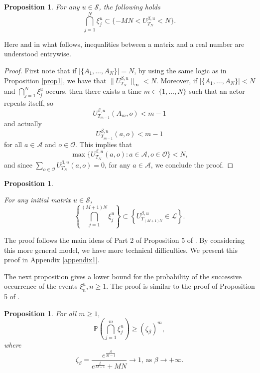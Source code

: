 \documentclass[11pt]{article}
\newtheorem{proposition}[theorem]{Proposition}
\theoremstyle{definition}
\newcommand{\st}{\mathcal{S}}
\newcommand{\A}{\mathcal{A}}
\newcommand{\opn}{\mathcal{O}}
\begin{document}
\begin{proposition} \label{prop2}
For any $u\in \st$, the following holds
$$
 \bigcap_{j=1}^N\xi_j^u\subset\{-MN<U^{\beta,u}_{T_N}<N\}.
$$
\end{proposition}

Here and in what follows, inequalities between a matrix and a real number are understood entrywise.

\begin{proof}
First note that if $|\{A_1, \ldots, A_N\}|=N$, 
by using the same logic as in Proposition \ref{prop1}, we have that $\|U^{\beta,u}_{T_N}\|_\infty<N$. Moreover, if $|\{A_1, \ldots, A_N\}|< N$ and $\bigcap_{j=1}^N\xi_j^u$ occurs, then there exists a time $m \in \{1, \ldots, N\}$ such that an actor repeats itself, so
$$
U_{T_{m-1}}^{\beta,u}(A_m,o) < m-1
$$
and actually
$$
U_{T_{m-1}}^{\beta,u}(a,o) < m-1
$$
for all $a \in \A$ and $o\in \opn$. This implies that
$$
\max\{U^{\beta,u}_{T_N}(a,o):a\in \A,o\in \opn\} < N, 
$$
and since $\sum_{o\in \opn}U^{\beta,u}_{T_N}(a,o)=0$, for any $a\in \A$, we conclude the proof.
\end{proof}

\begin{proposition}\label{prop3}

For any initial matrix $u\in\st$, 
$$
  \left\{\bigcap_{j=1}^{(M+1)N}\xi_j^u\right\} \subset \left\{U^{\beta,u}_{T_{(M+1)N}}\in\mathcal{L} \right\}.
$$
\end{proposition}

The proof follows the main ideas of Part 2 of Proposition 5 of \cite{galves2024fastconsensusmetastabilityhighly}. By considering this more general model, we have more technical difficulties. We present this proof in Appendix \ref{appendix1}.

The next proposition gives a lower bound for the probability of the successive occurrence of the events $\xi_n^u, n\geq 1$. The proof is similar to the proof of Proposition 5 of \cite{galves2024fastconsensusmetastabilityhighly}.

\begin{proposition}\label{prop4}
    For all $ m\geq 1,$
    $$ \mathbb{P}\left(\bigcap^m_{j=1}\xi_j^u\right)\geq (\zeta_{\beta})^m,
    $$
    where
    $$
        \zeta_{\beta}=\frac{e^{\frac{\beta}{M-1}}}{e^{\frac{\beta}{M-1}}+MN}\rightarrow1\text{, as }\beta\rightarrow+\infty.
    $$
\end{proposition}
\end{document}
